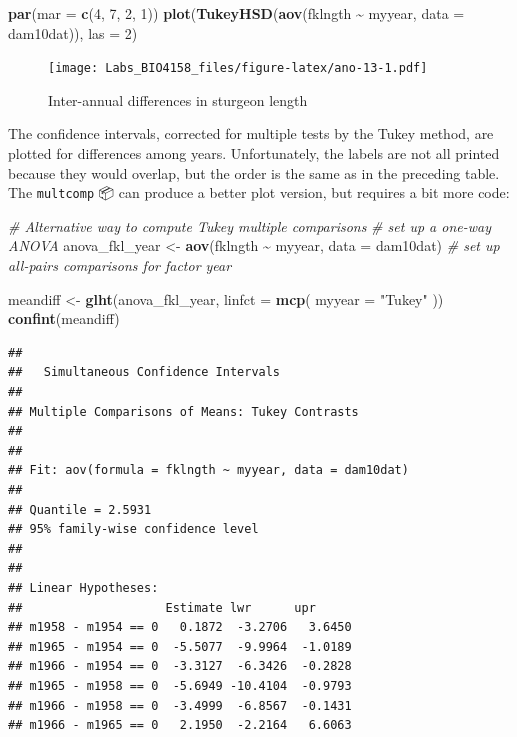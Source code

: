 \documentclass[
  12pt,
]{book}
\newenvironment{Shaded}{\begin{snugshade}}{\end{snugshade}}
\newcommand{\CommentTok}[1]{\textcolor[rgb]{0.56,0.35,0.01}{\textit{#1}}}
\newcommand{\DataTypeTok}[1]{\textcolor[rgb]{0.13,0.29,0.53}{#1}}
\newcommand{\DecValTok}[1]{\textcolor[rgb]{0.00,0.00,0.81}{#1}}
\newcommand{\KeywordTok}[1]{\textcolor[rgb]{0.13,0.29,0.53}{\textbf{#1}}}
\newcommand{\NormalTok}[1]{#1}
\newcommand{\OperatorTok}[1]{\textcolor[rgb]{0.81,0.36,0.00}{\textbf{#1}}}
\newcommand{\StringTok}[1]{\textcolor[rgb]{0.31,0.60,0.02}{#1}}
\begin{document}
\begin{Shaded}
\begin{Highlighting}[]
\KeywordTok{par}\NormalTok{(}\DataTypeTok{mar =} \KeywordTok{c}\NormalTok{(}\DecValTok{4}\NormalTok{, }\DecValTok{7}\NormalTok{, }\DecValTok{2}\NormalTok{, }\DecValTok{1}\NormalTok{))}
\KeywordTok{plot}\NormalTok{(}\KeywordTok{TukeyHSD}\NormalTok{(}\KeywordTok{aov}\NormalTok{(fklngth }\OperatorTok{\textasciitilde{}}\StringTok{ }\NormalTok{myyear, }\DataTypeTok{data =}\NormalTok{ dam10dat)), }\DataTypeTok{las =} \DecValTok{2}\NormalTok{)}
\end{Highlighting}
\end{Shaded}

\begin{figure}
\centering
\texttt{[image: Labs\_BIO4158\_files/figure-latex/ano-13-1.pdf]}
\caption{\label{fig:ano-13}Inter-annual differences in sturgeon length}
\end{figure}

The confidence intervals, corrected for multiple tests by the Tukey method, are plotted for differences among years. Unfortunately, the labels are not all printed because they would overlap, but the order is the same as in the preceding table. The \texttt{multcomp} 📦 can produce a better plot version, but requires a bit more code:

\begin{Shaded}
\begin{Highlighting}[]
\CommentTok{\# Alternative way to compute Tukey multiple comparisons}
\CommentTok{\# set up a one{-}way ANOVA}
\NormalTok{anova\_fkl\_year \textless{}{-}}\StringTok{ }\KeywordTok{aov}\NormalTok{(fklngth }\OperatorTok{\textasciitilde{}}\StringTok{ }\NormalTok{myyear, }\DataTypeTok{data =}\NormalTok{ dam10dat)}
\CommentTok{\# set up all{-}pairs comparisons for factor \textasciigrave{}year\textquotesingle{}}

\NormalTok{meandiff \textless{}{-}}\StringTok{ }\KeywordTok{glht}\NormalTok{(anova\_fkl\_year, }\DataTypeTok{linfct =} \KeywordTok{mcp}\NormalTok{(}
  \DataTypeTok{myyear =}
    \StringTok{"Tukey"}
\NormalTok{))}
\KeywordTok{confint}\NormalTok{(meandiff)}
\end{Highlighting}
\end{Shaded}

\begin{verbatim}
## 
##   Simultaneous Confidence Intervals
## 
## Multiple Comparisons of Means: Tukey Contrasts
## 
## 
## Fit: aov(formula = fklngth ~ myyear, data = dam10dat)
## 
## Quantile = 2.5931
## 95% family-wise confidence level
##  
## 
## Linear Hypotheses:
##                    Estimate lwr      upr     
## m1958 - m1954 == 0   0.1872  -3.2706   3.6450
## m1965 - m1954 == 0  -5.5077  -9.9964  -1.0189
## m1966 - m1954 == 0  -3.3127  -6.3426  -0.2828
## m1965 - m1958 == 0  -5.6949 -10.4104  -0.9793
## m1966 - m1958 == 0  -3.4999  -6.8567  -0.1431
## m1966 - m1965 == 0   2.1950  -2.2164   6.6063
\end{verbatim}
\end{document}
